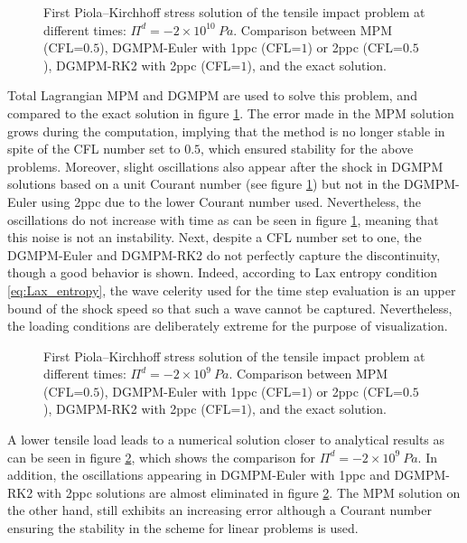 \begin{figure}[h!]
  \centering
  { \label{subfig:he_shock1}}
  { \label{subfig:he_shock2}}
  {}
  \caption{First Piola–Kirchhoff stress solution of the tensile impact problem at different times: $\Pi^d=-2\times 10^{10} \: Pa$. Comparison between MPM (CFL=$0.5$), DGMPM-Euler with 1ppc (CFL=$1$) or 2ppc (CFL=$0.5$), DGMPM-RK2 with 2ppc (CFL=$1$), and the exact solution.}
  \label{fig:he_shock}
\end{figure}
Total Lagrangian MPM and DGMPM are used to solve this problem, and compared to the exact solution in figure \ref{fig:he_shock}.
The error made in the MPM solution grows during the computation, implying that the method is no longer stable in spite of the CFL number set to $0.5$, which ensured stability for the above problems.
Moreover, slight oscillations also appear after the shock in DGMPM solutions based on a unit Courant number (see figure \ref{fig:he_shock}) but not in the DGMPM-Euler using 2ppc due to the lower Courant number used.
Nevertheless, the oscillations do not increase with time as can be seen in figure \ref{fig:he_shock}, meaning that this noise is not an instability.
Next, despite a CFL number set to one, the DGMPM-Euler and DGMPM-RK2 do not perfectly capture the discontinuity, though a good behavior is shown.
Indeed, according to Lax entropy condition \eqref{eq:Lax_entropy}, the wave celerity used for the time step evaluation is an upper bound of the shock speed so that such a wave cannot be captured.
Nevertheless, the loading conditions are deliberately extreme for the purpose of visualization.
\begin{figure}[h!]
  \centering
  { \label{subfig:he_low_shock1}}
  { \label{subfig:he_low_shock2}}
  {}
  \caption{First Piola–Kirchhoff stress solution of the tensile impact problem at different times: $\Pi^d=-2\times 10^{9} \: Pa$. Comparison between MPM (CFL=$0.5$), DGMPM-Euler with 1ppc (CFL=$1$) or 2ppc (CFL=$0.5$), DGMPM-RK2 with 2ppc (CFL=$1$), and the exact solution.}
  \label{fig:he_low_shock}
\end{figure}

A lower tensile load leads to a numerical solution closer to analytical results as can be seen in figure \ref{fig:he_low_shock}, which shows the comparison for $\Pi^d=-2\times 10^{9} \: Pa$.
In addition, the oscillations appearing in DGMPM-Euler with 1ppc and DGMPM-RK2 with 2ppc solutions are almost eliminated in figure \ref{fig:he_low_shock}.
The MPM solution on the other hand, still exhibits an increasing error although a Courant number ensuring the stability in the scheme for linear problems is used.


